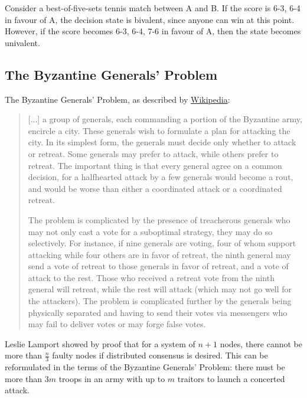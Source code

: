 Consider a best-of-five-sets tennis match between A and B. If the score is 6-3, 6-4 in favour of A, the decision state is bivalent, since anyone can win at this point. However, if the score becomes 6-3, 6-4, 7-6 in favour of A, then the state becomes univalent. 

\subsection{The Byzantine Generals' Problem}
The Byzantine Generals' Problem, as described by \href{https://en.wikipedia.org/wiki/Byzantine_fault_tolerance\#Byzantine_Generals\%27_Problem}{Wikipedia}:
\begin{quotation}
[...] a group of generals, each commanding a portion of the Byzantine army, encircle a city. These generals wish to formulate a plan for attacking the city. In its simplest form, the generals must decide only whether to attack or retreat. Some generals may prefer to attack, while others prefer to retreat. The important thing is that every general agree on a common decision, for a halfhearted attack by a few generals would become a rout, and would be worse than either a coordinated attack or a coordinated retreat.


The problem is complicated by the presence of treacherous generals who may not only cast a vote for a suboptimal strategy, they may do so selectively. For instance, if nine generals are voting, four of whom support attacking while four others are in favor of retreat, the ninth general may send a vote of retreat to those generals in favor of retreat, and a vote of attack to the rest. Those who received a retreat vote from the ninth general will retreat, while the rest will attack (which may not go well for the attackers). The problem is complicated further by the generals being physically separated and having to send their votes via messengers who may fail to deliver votes or may forge false votes. 
\end{quotation}

Leslie Lamport showed by proof that for a system of $n + 1$ nodes, there cannot be more than $\frac{n}{3}$ faulty nodes if distributed consensus is desired. This can be reformulated in the terms of the Byzantine Generals' Problem: there must be more than $3m$ troops in an army with up to $m$ traitors to launch a concerted attack.